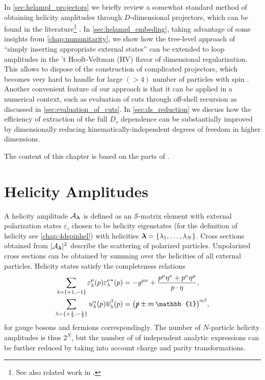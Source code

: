 In \cref{sec:helampl_projectors} we briefly review a somewhat standard 
method of obtaining helicity amplitudes through $D$-dimensional projectors,
which can be found in the literature\footnote{
  See also related work in \cite{Chen:2019wyb,Boels:2018nrr}. 
} \cite{Garland:2002ak, Moch:2002hm, Glover:2003cm, Glover:2004si,Gehrmann:2009vu,Gehrmann:2011aa}.
In \cref{sec:helampl_embeding}, 
taking advantage of some insights from \cref{chap:numunitarity},
we show how the tree-level approach of ``simply inserting appropriate external states'' can
be extended to loop amplitudes in the 't Hooft-Veltman (HV) flavor of dimensional regularization.
This allows to dispose of the construction of complicated projectors, which
becomes very hard to handle for large $(> 4)$ number of particles with spin \cite{Peraro:2019cjj}. 
Another convenient feature of our approach is that it can be applied in a numerical context, such
as evaluation of cuts through off-shell recursion as discussed in \cref{sec:evaluation_of_cuts}.
In \cref{sec:ds_reduction} we discuss how
the efficiency of extraction of the full $D_s$ dependence can be substantially improved
by dimensionally reducing kinematically-independent degrees of freedom in higher dimensions.

The content of this chapter is based on the parts of \cite{Anger:2018ove,Abreu:2018jgq,Abreu:2019odu}.

\section{Helicity Amplitudes}
\label{sec:HV_helicity_amplitudes}

A helicity amplitude $\mathcal{A}_{\vb*{\lambda}}$
is defined as an $\mathcal{S}$-matrix element
with external polarization states $\varepsilon_{i}$ chosen to be
helicity eigenstates (for the definition of helicity see \cref{chap:4dspinhel}) with helicities $\vb*{\lambda}=\{\lambda_1,\ldots{},\lambda_N\}$.
Cross sections obtained from $\vert \mathcal{A}_{\vb*{\lambda}}{} \vert^2$ describe
the scattering of polarized particles.
Unpolarized cross sections can be obtained by summing over the helicities of all external particles.
Helicity states satisfy the completeness relations
\begin{subequations}
  \label{eq:4d_completeness_relations}
  \begin{align}
    \sum_{\lambda=\{+1,-1\}} \varepsilon^\mu_\lambda(p){\varepsilon^\nu_\lambda}^{\star{}}(p)  &= -g^{\mu\nu} + \frac{p^\mu \eta^\nu + p^\nu \eta^\mu}{\sp(p,\eta)}, \\
    \sum_{\lambda=\{+\frac{1}{2},-\frac{1}{2}\}} u^\alpha_\lambda(p){\overline{u}_\lambda^\beta}(p)  &= \qty(\slashed{p}  \pm m\,\mathbb{1})^{\alpha\beta},
  \end{align}
\end{subequations}
for gauge bosons and fermions correspondingly.
The number of $N$-particle helicity amplitudes is thus $2^N$, but
the number of of independent analytic expressions can be further reduced by taking into account charge and parity transformations.

